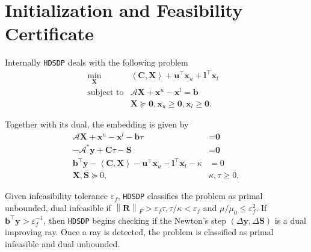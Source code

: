 \section{Initialization and Feasibility Certificate} \label{sec4}

Internally {{\texttt{HDSDP}}} deals with the following problem
\begin{eqnarray*}
  \min_{\mathbf{X}} & \left\langle \mathbf{C}, \mathbf{X} \right\rangle + \mathbf{u}^{\top} \mathbf{x}_u +
  \mathbf{l}^{\top} \mathbf{x}_l & \\
  \text{subject to} & \mathcal{A} \mathbf{X} + \mathbf{x}^u - \mathbf{x}^l = \mathbf{b} & \\
  & \mathbf{X} \succeq \textbf{0}, \mathbf{x}_u \geq \textbf{0}, \mathbf{x}_l \geq \textbf{0}. & 
\end{eqnarray*}

Together with its dual, the embedding is given by
\begin{align*}
  \mathcal{A} \mathbf{X} + \mathbf{x}^u - \mathbf{x}^l - \mathbf{b} \tau & = \textbf{0}\\
  - \mathcal{A}^{\ast} \mathbf{y} + \mathbf{C} \tau - \mathbf{S} & = \textbf{0}\\
  \mathbf{b}^{\top} \mathbf{y} - \left\langle \mathbf{C}, \mathbf{X} \right\rangle - \mathbf{u}^{\top} \mathbf{x}_u -
  \mathbf{l}^{\top} \mathbf{x}_l - \kappa & = 0\\
  \mathbf{X}, \mathbf{S} \succeq 0, &  \kappa, \tau \geq 0,
\end{align*}

 Given infeasibility tolerance $\varepsilon_f$, {{\texttt{HDSDP}}} classifies the problem as primal unbounded, dual infeasible if $\left\| \mathbf{R}
\right\|_F > \varepsilon_f \tau, \tau / \kappa < \varepsilon_f$ and $\mu /
\mu_0 \leq \varepsilon_f^2$. If $\mathbf{b}^{\top} \mathbf{y} >
\varepsilon_f^{- 1}$, then {{\texttt{HDSDP}}} begins checking if the Newton's
step $( \Delta \mathbf{y}, \Delta \mathbf{S} )$ is a dual improving ray. Once a ray is detected, the problem is classified as primal
infeasible and dual unbounded.
